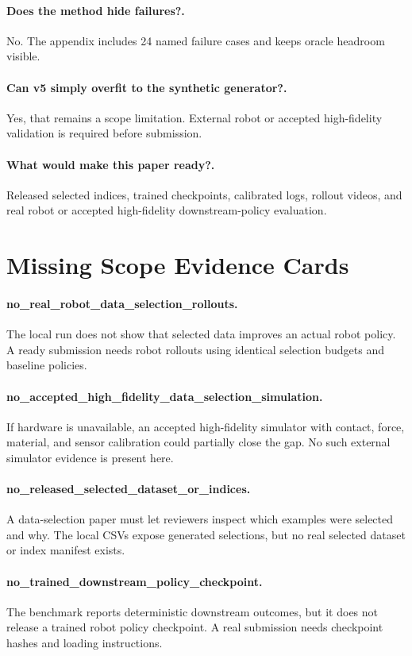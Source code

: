 \documentclass{article}
\begin{document}
\paragraph{Does the method hide failures?.} No. The appendix includes 24 named failure cases and keeps oracle headroom visible.
\paragraph{Can v5 simply overfit to the synthetic generator?.} Yes, that remains a scope limitation. External robot or accepted high-fidelity validation is required before submission.
\paragraph{What would make this paper ready?.} Released selected indices, trained checkpoints, calibrated logs, rollout videos, and real robot or accepted high-fidelity downstream-policy evaluation.
\clearpage
\section{Missing Scope Evidence Cards}
\paragraph{no\_real\_robot\_data\_selection\_rollouts.} The local run does not show that selected data improves an actual robot policy. A ready submission needs robot rollouts using identical selection budgets and baseline policies.
\paragraph{no\_accepted\_high\_fidelity\_data\_selection\_simulation.} If hardware is unavailable, an accepted high-fidelity simulator with contact, force, material, and sensor calibration could partially close the gap. No such external simulator evidence is present here.
\paragraph{no\_released\_selected\_dataset\_or\_indices.} A data-selection paper must let reviewers inspect which examples were selected and why. The local CSVs expose generated selections, but no real selected dataset or index manifest exists.
\paragraph{no\_trained\_downstream\_policy\_checkpoint.} The benchmark reports deterministic downstream outcomes, but it does not release a trained robot policy checkpoint. A real submission needs checkpoint hashes and loading instructions.
\end{document}

